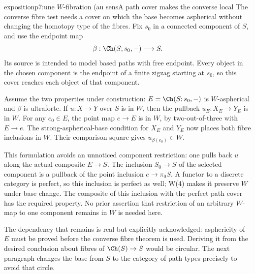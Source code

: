 \begin{dcomment}{exposition}{p7:une $W$-fibration (au sens}{A path cover makes the converse local}
The converse fibre test needs a cover on which the base becomes aspherical without changing the homotopy type of the fibres. Fix \(s_0\) in a connected component of \(S\), and use the endpoint map
\[
 \beta:\Ch(S;s_0,-)\longrightarrow S .
\]
Its source is intended to model based paths with free endpoint. Every object in the chosen component is the endpoint of a finite zigzag starting at \(s_0\), so this cover reaches each object of that component.

Assume the two properties under construction: \(E=\Ch(S;s_0,-)\) is \(W\)-aspherical and \(\beta\) is ultraforte. If \(u:X\to Y\) over \(S\) is in \(W\), then the pullback \(u_E:X_E\to Y_E\) is in \(W\). For any \(e_0\in E\), the point map \(e\to E\) is in \(W\), by two-out-of-three with \(E\to e\). The strong-aspherical-base condition for \(X_E\) and \(Y_E\) now places both fibre inclusions in \(W\). Their comparison square gives \(u_{\beta(e_0)}\in W\).

This formulation avoids an unnoticed component restriction: one pulls back \(u\) along the actual composite \(E\to S\). The inclusion \(S_0\to S\) of the selected component is a pullback of the point inclusion \(e\to\pi_0S\). A functor to a discrete category is perfect, so this inclusion is perfect as well; W(4) makes it preserve \(W\) under base change. The composite of this inclusion with the perfect path cover has the required property. No prior assertion that restriction of an arbitrary \(W\)-map to one component remains in \(W\) is needed here.

The dependency that remains is real but explicitly acknowledged: asphericity of \(E\) must be proved before the converse fibre theorem is used. Deriving it from the desired conclusion about fibres of \(\Ch(S)\to S\) would be circular. The next paragraph changes the base from \(S\) to the category of path types precisely to avoid that circle.
\end{dcomment}

